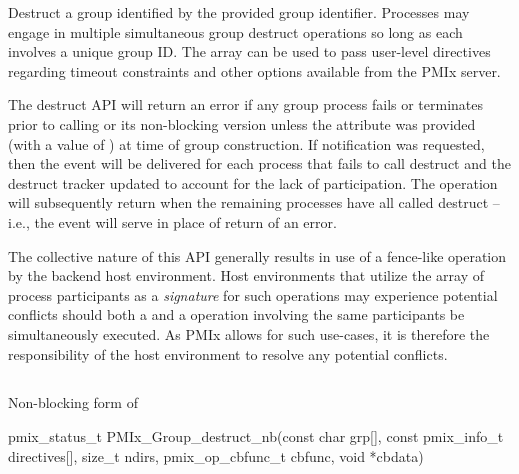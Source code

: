 \descr

Destruct a group identified by the provided group identifier. Processes may engage in multiple simultaneous group destruct operations so long as each involves a unique group ID. The  array can be used to pass user-level directives regarding timeout constraints and other options available from the \ac{PMIx} server.

The destruct \ac{API} will return an error if any group process fails or terminates prior to calling  or its non-blocking version unless the  attribute was provided (with a value of ) at time of group construction. If notification was requested, then the  event will be delivered for each process that fails to call destruct and the destruct tracker updated to account for the lack of participation. The  operation will subsequently return  when the remaining processes have all called destruct – i.e., the event will serve in place of return of an error.

\advicermstart
The collective nature of this \ac{API} generally results in use of a fence-like operation by the backend host environment. Host environments that utilize the array of process participants as a \emph{signature} for such operations may experience potential conflicts should both a  and a  operation involving the same participants be simultaneously executed. As \ac{PMIx} allows for such use-cases, it is therefore the responsibility of the host environment to resolve any potential conflicts.
\advicermend

\subsection{}

\summary

Non-blocking form of 

\format

\cspecificstart
\begin{codepar}
pmix_status_t
PMIx_Group_destruct_nb(const char grp[],
                       const pmix_info_t directives[], size_t ndirs,
                       pmix_op_cbfunc_t cbfunc, void *cbdata)
\end{codepar}
\cspecificend


